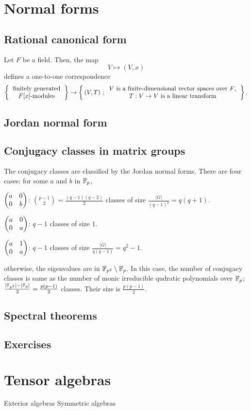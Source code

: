 \documentclass{../note}
\begin{document}
\chapter{Normal forms}
\section{Rational canonical form}
\begin{prb}
Let $F$ be a field.
Then, the map
\[V\mapsto(V,x)\]
defines a one-to-one correspondence
\[\left\{\begin{tabular}{c}finitely generated\\$F[x]$-modules\end{tabular}\right\}\to\left\{\,(V,T)\ ;\begin{tabular}{c}$V$ is a finite-dimensional vector spaces over $F$,\\$T:V\to V$ is a linear transform\end{tabular}\right\}.\]
\end{prb}
\begin{prb}
\end{prb}
\section{Jordan normal form}


\section{Conjugacy classes in matrix groups}

\begin{prb}
The conjugacy classes are classified by the Jordan normal forms.
There are four cases: for some $a$ and $b$ in $\mathbb{F}_p$,
\begin{parts}
\item $\begin{pmatrix}a&0\\0&b\end{pmatrix}$: $\binom{p-1}2=\frac{(q-1)(q-2)}2$ classes of size $\frac{|G|}{(q-1)^2}=q(q+1)$.
\item $\begin{pmatrix}a&0\\0&a\end{pmatrix}$: $q-1$ classes of size $1$.
\item $\begin{pmatrix}a&1\\0&a\end{pmatrix}$: $q-1$ classes of size $\frac{|G|}{q(q-1)}=q^2-1$.
\item otherwise, the eigenvalues are in $\mathbb{F}_{p^2}\setminus\mathbb{F}_p$.
In this case, the number of conjugacy classes is same as the number of monic irreducible qudratic polynomials over $\mathbb{F}_p$; $\frac{|\mathbb{F}_{p^2}|-|\mathbb{F}_p|}2=\frac{p(p-1)}2$ classes.
Their size is $\frac{p(p-1)}2$.
\end{parts}
\end{prb}

\section{Spectral theorems}



\section*{Exercises}




\chapter{Tensor algebras}
Exterior algebras
Symmetric algebras
\end{document}
